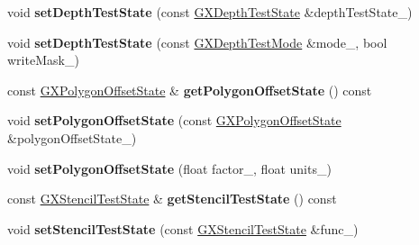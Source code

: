 \begin{DoxyCompactItemize}
\item 
void {\bfseries set\+Depth\+Test\+State} (const \hyperlink{class_magnum_1_1_g_x_depth_test_state}{G\+X\+Depth\+Test\+State} \&depth\+Test\+State\+\_\+)\hypertarget{class_magnum_1_1_g_x_context_a92fc4f92b0074224b3316690da2ff1c9}{}\label{class_magnum_1_1_g_x_context_a92fc4f92b0074224b3316690da2ff1c9}

\item 
void {\bfseries set\+Depth\+Test\+State} (const \hyperlink{class_magnum_1_1_g_x_depth_test_mode}{G\+X\+Depth\+Test\+Mode} \&mode\+\_\+, bool write\+Mask\+\_\+)\hypertarget{class_magnum_1_1_g_x_context_a850fc290dd4a385ab0b38208da2c3926}{}\label{class_magnum_1_1_g_x_context_a850fc290dd4a385ab0b38208da2c3926}

\item 
const \hyperlink{class_magnum_1_1_g_x_polygon_offset_state}{G\+X\+Polygon\+Offset\+State} \& {\bfseries get\+Polygon\+Offset\+State} () const \hypertarget{class_magnum_1_1_g_x_context_a19206dd8521338e47c185f81598e298a}{}\label{class_magnum_1_1_g_x_context_a19206dd8521338e47c185f81598e298a}

\item 
void {\bfseries set\+Polygon\+Offset\+State} (const \hyperlink{class_magnum_1_1_g_x_polygon_offset_state}{G\+X\+Polygon\+Offset\+State} \&polygon\+Offset\+State\+\_\+)\hypertarget{class_magnum_1_1_g_x_context_a75d204c3899565fadd9cad49a983e89c}{}\label{class_magnum_1_1_g_x_context_a75d204c3899565fadd9cad49a983e89c}

\item 
void {\bfseries set\+Polygon\+Offset\+State} (float factor\+\_\+, float units\+\_\+)\hypertarget{class_magnum_1_1_g_x_context_aff2bbb79caf79f5dfffddce4673276d0}{}\label{class_magnum_1_1_g_x_context_aff2bbb79caf79f5dfffddce4673276d0}

\item 
const \hyperlink{class_magnum_1_1_g_x_stencil_test_state}{G\+X\+Stencil\+Test\+State} \& {\bfseries get\+Stencil\+Test\+State} () const \hypertarget{class_magnum_1_1_g_x_context_a82a9ced7888e1aeba24a58fd58f36ba1}{}\label{class_magnum_1_1_g_x_context_a82a9ced7888e1aeba24a58fd58f36ba1}

\item 
void {\bfseries set\+Stencil\+Test\+State} (const \hyperlink{class_magnum_1_1_g_x_stencil_test_state}{G\+X\+Stencil\+Test\+State} \&func\+\_\+)\hypertarget{class_magnum_1_1_g_x_context_ab03151a23d92d6c23d409f866a074b6a}{}\label{class_magnum_1_1_g_x_context_ab03151a23d92d6c23d409f866a074b6a}


\end{DoxyCompactItemize}
